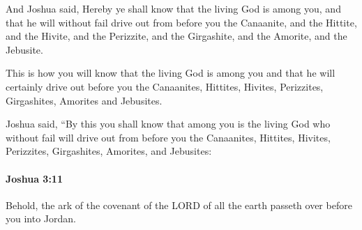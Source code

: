 			\begin{versebox}
					\item[BHS] 
					\item[ASV] And Joshua said, Hereby ye shall know that the living God is among you, and that he will without fail drive out from before you the Canaanite, and the Hittite, and the Hivite, and the Perizzite, and the Girgashite, and the Amorite, and the Jebusite.
					\item[NIV] This is how you will know that the living God is among you and that he will certainly drive out before you the Canaanites, Hittites, Hivites, Perizzites, Girgashites, Amorites and Jebusites.
					\item[NRSV] Joshua said, “By this you shall know that among you is the living God who without fail will drive out from before you the Canaanites, Hittites, Hivites, Perizzites, Girgashites, Amorites, and Jebusites:
			\end{versebox}

		\paragraph{Joshua 3:11} %
			\label{JOSHUA-3-11}

			Behold, the ark of the covenant of the LORD of all the earth passeth over before you into Jordan.

